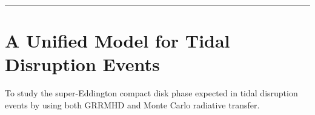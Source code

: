 \documentclass[onecolumn]{aastex63}
\begin{document}


\vspace{1cm}
\hrule
\vspace{1cm}

\section{A Unified Model for Tidal Disruption Events}
\begin{centering}

\cite{dai2018}

\end{centering}



To study the super-Eddington compact disk phase expected in tidal disruption events by using both GRRMHD and Monte Carlo radiative transfer.


\end{document}
